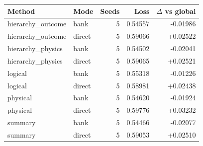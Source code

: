 \begin{tabular}{llrrr}
\hline
Method & Mode & Seeds & Loss & $\Delta$ vs global \\
\hline
hierarchy\_outcome & bank & 5 & 0.54557 & -0.01986 \\
hierarchy\_outcome & direct & 5 & 0.59066 & +0.02522 \\
hierarchy\_physics & bank & 5 & 0.54502 & -0.02041 \\
hierarchy\_physics & direct & 5 & 0.59065 & +0.02521 \\
logical & bank & 5 & 0.55318 & -0.01226 \\
logical & direct & 5 & 0.58981 & +0.02438 \\
physical & bank & 5 & 0.54620 & -0.01924 \\
physical & direct & 5 & 0.59776 & +0.03232 \\
summary & bank & 5 & 0.54466 & -0.02077 \\
summary & direct & 5 & 0.59053 & +0.02510 \\
\hline
\end{tabular}

